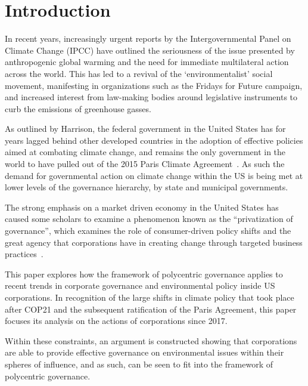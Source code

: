 \section{Introduction} %

In recent years, increasingly urgent reports by the Intergovernmental
Panel on Climate Change (IPCC) have outlined the seriousness of the
issue presented by anthropogenic global warming and the need for
immediate multilateral action across the world. This has led to a
revival of the `environmentalist' social movement, manifesting in
organizations such as the Fridays for Future campaign, and increased
interest from law-making bodies around legislative instruments to curb
the emissions of greenhouse gasses.

As outlined by Harrison, the federal government in the United States
has for years lagged behind other developed countries in the adoption
of effective policies aimed at combating climate change, and remains
the only government in the world to have pulled out of the 2015 Paris
Climate Agreement~\citep{harrison2010united}. As such the demand for
governmental action on climate change within the US is being met at
lower levels of the governance hierarchy, by state and municipal
governments.

The strong emphasis on a market driven economy in the United States
has caused some scholars to examine a phenomenon known as the
``privatization of governance'', which examines the role of
consumer-driven policy shifts and the great agency that corporations
have in creating change through targeted business
practices~\citep{cashore2002legitimacy}.

This paper explores how the framework of polycentric governance
applies to recent trends in corporate governance and environmental
policy inside US corporations. In recognition of the
large shifts in climate policy that took place after COP21 and the
subsequent ratification of the Paris Agreement, this paper focuses its
analysis on the actions of corporations since 2017.

Within these constraints, an argument is constructed showing that
corporations are able to provide effective governance on environmental
issues within their spheres of influence, and as such, can be seen to
fit into the framework of polycentric governance.

